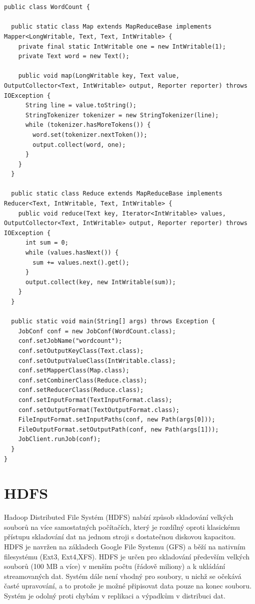 \documentclass[thesis=M,czech]{FITthesis}[2012/06/26]
\begin{document}
\begin{lstlisting}[frame=single]  % Start your code-block


public class WordCount {

  public static class Map extends MapReduceBase implements Mapper<LongWritable, Text, Text, IntWritable> {
    private final static IntWritable one = new IntWritable(1);
    private Text word = new Text();

    public void map(LongWritable key, Text value, OutputCollector<Text, IntWritable> output, Reporter reporter) throws IOException {
      String line = value.toString();
      StringTokenizer tokenizer = new StringTokenizer(line);
      while (tokenizer.hasMoreTokens()) {
        word.set(tokenizer.nextToken());
        output.collect(word, one);
      }
    }
  }

  public static class Reduce extends MapReduceBase implements Reducer<Text, IntWritable, Text, IntWritable> {
    public void reduce(Text key, Iterator<IntWritable> values, OutputCollector<Text, IntWritable> output, Reporter reporter) throws IOException {
      int sum = 0;
      while (values.hasNext()) {
        sum += values.next().get();
      }
      output.collect(key, new IntWritable(sum));
    }
  }

  public static void main(String[] args) throws Exception {
    JobConf conf = new JobConf(WordCount.class);
    conf.setJobName("wordcount");
    conf.setOutputKeyClass(Text.class);
    conf.setOutputValueClass(IntWritable.class);
    conf.setMapperClass(Map.class);
    conf.setCombinerClass(Reduce.class);
    conf.setReducerClass(Reduce.class);
    conf.setInputFormat(TextInputFormat.class);
    conf.setOutputFormat(TextOutputFormat.class);
    FileInputFormat.setInputPaths(conf, new Path(args[0]));
    FileOutputFormat.setOutputPath(conf, new Path(args[1]));
    JobClient.runJob(conf);
  }
}
\end{lstlisting}

\section{HDFS}
Hadoop Distributed File Systém (HDFS) nabízí způsob skladování velkých souborů na více samostatných počítačích, který je rozdílný oproti klasickému přístupu skladování dat na jednom stroji s dostatečnou diskovou kapacitou. HDFS je navržen na základech Google File Systemu (GFS) a běží na nativním filesystému (Ext3, Ext4,XFS). HDFS je určen pro skladování především velkých souborů (100 MB a více) v menším počtu (řádově miliony) a k ukládání streamovaných dat. Systém dále není vhodný pro soubory, u nichž se očekává časté upravování, a to protože je možné připisovat data pouze na konec souboru. Systém je odolný proti chybám v replikaci a výpadkům v distribuci dat.\cite{HDFSWEB}
\end{document}
